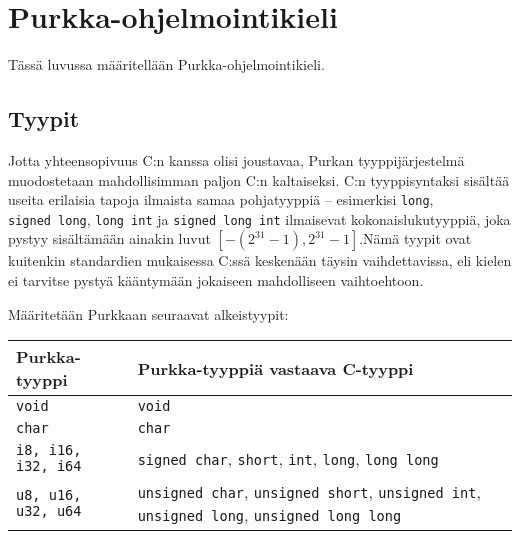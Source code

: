 \section{Purkka-ohjelmointikieli}

Tässä luvussa määritellään Purkka-ohjelmointikieli.

\subsection{Tyypit}

Jotta yhteensopivuus C:n kanssa olisi joustavaa, Purkan tyyppijärjestelmä
muodostetaan mahdollisimman paljon C:n kaltaiseksi. C:n tyyppisyntaksi sisältää
useita erilaisia tapoja ilmaista samaa pohjatyyppiä -- esimerkisi
\texttt{long}, \texttt{signed~long}, \texttt{long~int} ja
\texttt{signed~long~int} ilmaisevat kokonaislukutyyppiä, joka pystyy
sisältämään ainakin luvut $[-(2^{31} - 1), 2^{31}-1]$.\citationneeded Nämä
tyypit ovat kuitenkin standardien mukaisessa C:ssä keskenään täysin
vaihdettavissa, eli kielen ei tarvitse pystyä kääntymään jokaiseen mahdolliseen
vaihtoehtoon.

Määritetään Purkkaan seuraavat alkeistyypit: \\[0.3cm]
\begin{tabular}{@{}lp{10cm}@{}} \toprule
    Purkka-tyyppi & Purkka-tyyppiä vastaava C-tyyppi \\ \midrule
    \texttt{void} & \texttt{void} \\
    \texttt{char} & \texttt{char} \\
    \texttt{i8, i16, i32, i64} & \texttt{signed char}, \texttt{short}, \texttt{int}, \texttt{long}, \texttt{long long} \\
    \texttt{u8, u16, u32, u64} & \texttt{unsigned char}, \texttt{unsigned short}, \texttt{unsigned int}, \texttt{unsigned long}, \texttt{unsigned long long} \\
    \bottomrule
\end{tabular} \\

